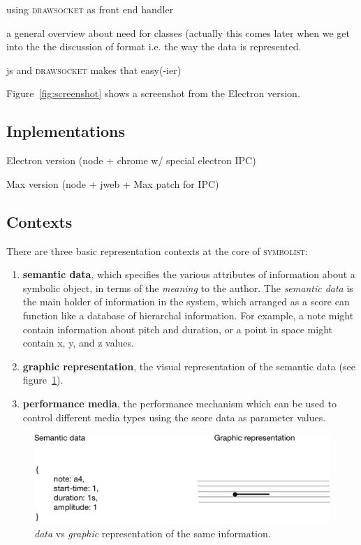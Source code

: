 \documentclass{article}
\def\symbolist{\textsc{symbolist}\xspace}
\def\drawsocket{\textsc{drawsocket}\xspace}
\begin{document}
using \drawsocket as front end handler

a general overview about need for classes (actually this comes later when we get into the the discussion of format i.e. the way the data is represented.

js and \drawsocket makes that easy(-ier)

Figure~\ref{fig:screenshot} shows a screenshot from the Electron version.


\subsection{Inplementations}\label{sec:Max}

Electron version (node + chrome w/ special electron IPC)

Max version (node + jweb + Max patch for IPC)

\subsection{Contexts}\label{subsec:contexts}

There are three basic representation contexts at the core of \symbolist:

\begin{enumerate}\itemsep0pt
\item \textbf{semantic data}, which specifies the various attributes of information about a symbolic object, in terms of the \textit{meaning} to the author. The  \textit{semantic data} is the main holder of information in the system, which arranged as a score can function like a database of hierarchal information. For example, a note might contain information about pitch and duration, or a point in space might contain x, y, and z values.
\item \textbf{graphic representation}, the visual representation of the semantic data (see figure~\ref{fig:graphic-representation}).
\item \textbf{performance media}, the performance mechanism which can be used to control different media types using the score data as parameter values. 
\end{enumerate}



\begin{figure}[ht!]
\includegraphics[width=1\columnwidth]{graphic-representation.pdf}
\caption{\textit{data} vs \textit{graphic} representation of the same information.
\label{fig:graphic-representation}}
\end{figure}
\end{document}
